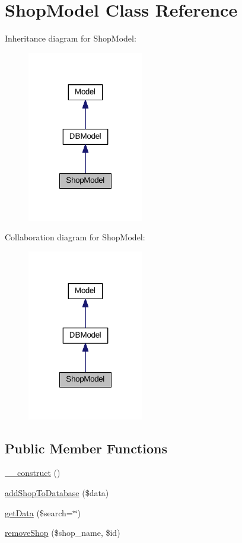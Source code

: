\hypertarget{classShopModel}{\section{Shop\+Model Class Reference}
\label{classShopModel}
}


Inheritance diagram for Shop\+Model\+:\nopagebreak
\begin{figure}[H]
\begin{center}
\leavevmode
\includegraphics[width=144pt]{classShopModel__inherit__graph}
\end{center}
\end{figure}


Collaboration diagram for Shop\+Model\+:\nopagebreak
\begin{figure}[H]
\begin{center}
\leavevmode
\includegraphics[width=144pt]{classShopModel__coll__graph}
\end{center}
\end{figure}
\subsection*{Public Member Functions}
\begin{DoxyCompactItemize}
\item 
\hyperlink{classShopModel_abdc933b979dc53048b3ba5be1331acf1}{\+\_\+\+\_\+construct} ()
\item 
\hyperlink{classShopModel_a67653f592dcfd15e7c3e8a0262fb824b}{add\+Shop\+To\+Database} (\$data)
\item 
\hyperlink{classShopModel_a5c5c4b2e0ea0e4adb98e6e6dea5011b6}{get\+Data} (\$search=\char`\"{}\char`\"{})
\item 
\hyperlink{classShopModel_ae035aa872e97c08247d203f90e228fe2}{remove\+Shop} (\$shop\+\_\+name, \$id)
\end{DoxyCompactItemize}
